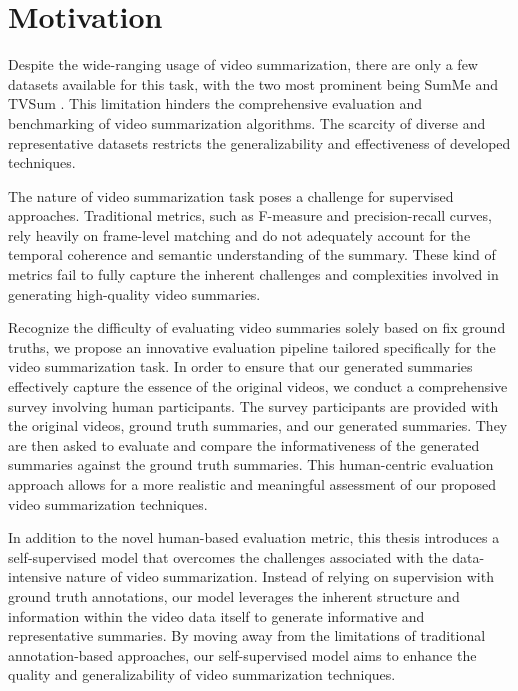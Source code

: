 \section{Motivation}
\label{section:intro-motivation}

Despite the wide-ranging usage of video summarization, there are only a few datasets available for this task, with the two most prominent being SumMe \cite{SumMe} and TVSum \cite{TVSum}. This limitation hinders the comprehensive evaluation and benchmarking of video summarization algorithms. The scarcity of diverse and representative datasets restricts the generalizability and effectiveness of developed techniques.

The nature of video summarization task poses a challenge for supervised approaches. Traditional metrics, such as F-measure and precision-recall curves, rely heavily on frame-level matching and do not adequately account for the temporal coherence and semantic understanding of the summary. These kind of metrics fail to fully capture the inherent challenges and complexities involved in generating high-quality video summaries.

Recognize the difficulty of evaluating video summaries solely based on fix ground truths, we propose an innovative evaluation pipeline tailored specifically for the video summarization task. In order to ensure that our generated summaries effectively capture the essence of the original videos, we conduct a comprehensive survey involving human participants. The survey participants are provided with the original videos, ground truth summaries, and our generated summaries. They are then asked to evaluate and compare the informativeness of the generated summaries against the ground truth summaries. This human-centric evaluation approach allows for a more realistic and meaningful assessment of our proposed video summarization techniques.

In addition to the novel human-based evaluation metric, this thesis introduces a self-supervised model that overcomes the challenges associated with the data-intensive nature of video summarization. Instead of relying on supervision with ground truth annotations, our model leverages the inherent structure and information within the video data itself to generate informative and representative summaries. By moving away from the limitations of traditional annotation-based approaches, our self-supervised model aims to enhance the quality and generalizability of video summarization techniques.